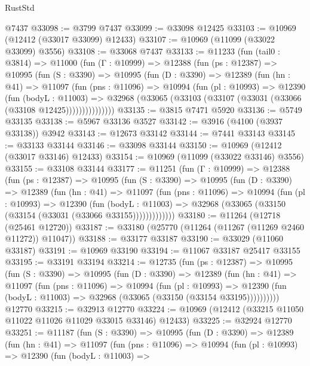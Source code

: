 \begin{lexlean}{RustStd}
\begin{coremodule}
    @7437
@33098 := @3799 @7437
@33099 := @33098 @12425
@33103 := @10969 (@12412 (@33017 @33099) @12433)
@33107 := @10969 (@11099 (@33022 @33099) @3556)
@33108 := @33068 @7437
@33133 := @11233
    (fun (tail0 : @3814) =>
    @11000
      (fun (Γ : @10999) =>
      @12388
        (fun (ps : @12387) =>
        @10995
          (fun (S : @3390) =>
          @10995
            (fun (D : @3390) =>
            @12389
              (fun (hn : @41) =>
              @11097
                (fun (pns : @11096) =>
                @10994
                  (fun (pl : @10993) =>
                  @12390
                    (fun (bodyL : @11003) =>
                    @32968 (@33065 (@33103 (@33107 (@33031 (@33066 (@33108 @12425)))))))))))))))
@33135 := @3815 @7471 @5920
@33136 := @5749 @33135
@33138 := @5967 @33136 @3527
@33142 := @3916 (@4100 (@3937 @33138)) @3942
@33143 := @12673 @33142
@33144 := @7441 @33143
@33145 := @33133 @33144
@33146 := @33098 @33144
@33150 := @10969 (@12412 (@33017 @33146) @12433)
@33154 := @10969 (@11099 (@33022 @33146) @3556)
@33155 := @33108 @33144
@33177 := @11251
    (fun (Γ : @10999) =>
    @12388
      (fun (ps : @12387) =>
      @10995
        (fun (S : @3390) =>
        @10995
          (fun (D : @3390) =>
          @12389
            (fun (hn : @41) =>
            @11097
              (fun (pns : @11096) =>
              @10994
                (fun (pl : @10993) =>
                @12390
                  (fun (bodyL : @11003) =>
                  @32968 (@33065 (@33150 (@33154 (@33031 (@33066 @33155)))))))))))))
@33180 := @11264 (@12718 (@25461 @12720))
@33187 := @33180 (@25770 (@11264 (@11267 (@11269 @2460 @11272)) @11047))
@33188 := @33177 @33187
@33190 := @33029 (@11060 @33187)
@33191 := @10969 @33190
@33194 := @11067 @33187 @25417 @33155
@33195 := @33191 @33194
@33214 := @12735
    (fun (ps : @12387) =>
    @10995
      (fun (S : @3390) =>
      @10995
        (fun (D : @3390) =>
        @12389
          (fun (hn : @41) =>
          @11097
            (fun (pns : @11096) =>
            @10994
              (fun (pl : @10993) =>
              @12390 (fun (bodyL : @11003) => @32968 (@33065 (@33150 (@33154 @33195))))))))))
    @12770
@33215 := @32913 @12770
@33224 := @10969 (@12412 (@33215 @11050 @11022 @11026 @11029 @33015 @33146) @12433)
@33225 := @32924 @12770
@33251 := @11187
    (fun (S : @3390) =>
    @10995
      (fun (D : @3390) =>
      @12389
        (fun (hn : @41) =>
        @11097
          (fun (pns : @11096) =>
          @10994
            (fun (pl : @10993) =>
            @12390
              (fun (bodyL : @11003) =>

\end{coremodule}
\end{lexlean}
